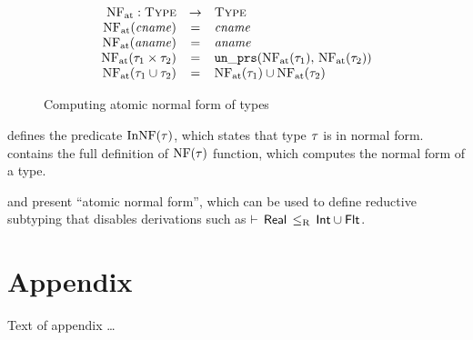 \begin{figure}
	\[
	\begin{array}{rcl}
	\mathop{\mathrm{NF}_{\mathrm{at}}}: \textsc{Type} &\rightarrow& \textsc{Type} \\
	\mathop{\mathrm{NF}_{\mathrm{at}}}(\mathit{cname}) &=& \mathit{cname} \\
	\mathop{\mathrm{NF}_{\mathrm{at}}}(\mathit{aname}) &=& \mathit{aname} \\
	\mathop{\mathrm{NF}_{\mathrm{at}}}(\tau_1 \times \tau_2) &=& \mathop{\mathtt{un\_prs}}(\mathop{\mathrm{NF}_{\mathrm{at}}}(\tau_1), \, \mathop{\mathrm{NF}_{\mathrm{at}}}(\tau_2))	\\
	\mathop{\mathrm{NF}_{\mathrm{at}}}(\tau_1 \cup \tau_2) &=& \mathop{\mathrm{NF}_{\mathrm{at}}}(\tau_1) \cup \mathop{\mathrm{NF}_{\mathrm{at}}}(\tau_2) \\
	\end{array}
	\]
	\caption{Computing atomic normal form of \BetaJulia types}
	\label{fig:bjnom-calc-nf-full}
\end{figure}

 defines the predicate $\mathop{\mathrm{InNF}}(\tau)$, which states
that type $\tau$ is in normal form.
 contains the full definition of $\mathop{\mathrm{NF}}(\tau)$ function,
which computes the normal form of a type.

 and  present 
``atomic normal form'', which can be used to define reductive subtyping
that disables derivations such as $\vdash \, \mathsf{Real} \, \leq_\mathrm{R} \, \mathsf{Int} \cup \mathsf{Flt}$.

\section{Appendix}
Text of appendix \ldots

